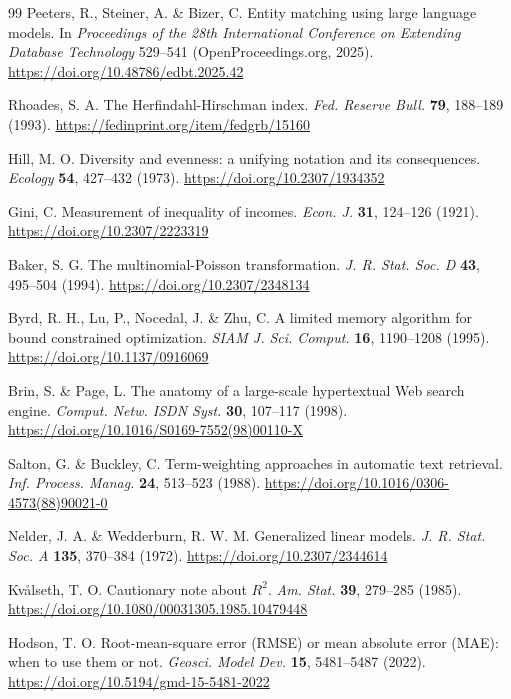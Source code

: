 \begin{thebibliography}{99}
Peeters, R., Steiner, A. \& Bizer, C. Entity matching using large language models. In \textit{Proceedings of the 28th International Conference on Extending Database Technology} 529--541 (OpenProceedings.org, 2025). \url{https://doi.org/10.48786/edbt.2025.42}

Rhoades, S. A. The Herfindahl-Hirschman index. \textit{Fed. Reserve Bull.} \textbf{79}, 188--189 (1993). \url{https://fedinprint.org/item/fedgrb/15160}

Hill, M. O. Diversity and evenness: a unifying notation and its consequences. \textit{Ecology} \textbf{54}, 427--432 (1973). \url{https://doi.org/10.2307/1934352}

Gini, C. Measurement of inequality of incomes. \textit{Econ. J.} \textbf{31}, 124--126 (1921). \url{https://doi.org/10.2307/2223319}

Baker, S. G. The multinomial-Poisson transformation. \textit{J. R. Stat. Soc. D} \textbf{43}, 495--504 (1994). \url{https://doi.org/10.2307/2348134}

Byrd, R. H., Lu, P., Nocedal, J. \& Zhu, C. A limited memory algorithm for bound constrained optimization. \textit{SIAM J. Sci. Comput.} \textbf{16}, 1190--1208 (1995). \url{https://doi.org/10.1137/0916069}

Brin, S. \& Page, L. The anatomy of a large-scale hypertextual Web search engine. \textit{Comput. Netw. ISDN Syst.} \textbf{30}, 107--117 (1998). \url{https://doi.org/10.1016/S0169-7552(98)00110-X}

Salton, G. \& Buckley, C. Term-weighting approaches in automatic text retrieval. \textit{Inf. Process. Manag.} \textbf{24}, 513--523 (1988). \url{https://doi.org/10.1016/0306-4573(88)90021-0}

Nelder, J. A. \& Wedderburn, R. W. M. Generalized linear models. \textit{J. R. Stat. Soc. A} \textbf{135}, 370--384 (1972). \url{https://doi.org/10.2307/2344614}

Kvålseth, T. O. Cautionary note about $R^2$. \textit{Am. Stat.} \textbf{39}, 279--285 (1985). \url{https://doi.org/10.1080/00031305.1985.10479448}

Hodson, T. O. Root-mean-square error (RMSE) or mean absolute error (MAE): when to use them or not. \textit{Geosci. Model Dev.} \textbf{15}, 5481--5487 (2022). \url{https://doi.org/10.5194/gmd-15-5481-2022}


\end{thebibliography}
